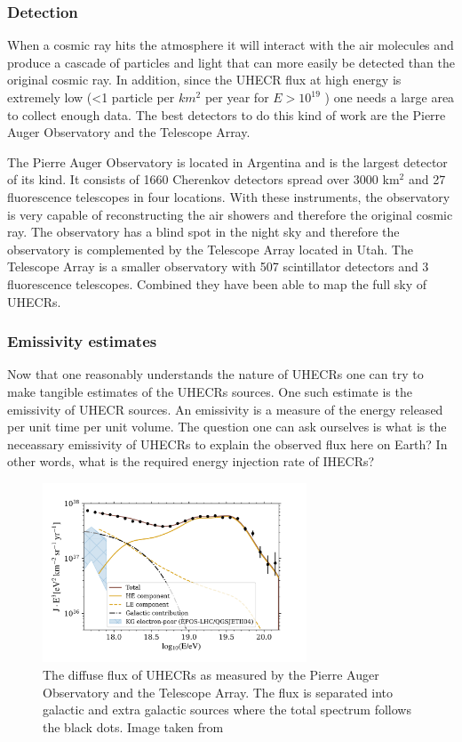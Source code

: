\documentclass{article}
\begin{document}

\subsubsection{Detection}
When a cosmic ray hits the atmosphere it will interact with the air molecules and produce a cascade of particles and light that can more easily be detected than 
the original cosmic ray. In addition, since the UHECR flux at high energy is extremely low (<1 particle per $km^2$ per year for $E > 10^{19}$ ) one needs a large area to collect enough data. 
The best detectors to do this kind of work are the Pierre Auger Observatory and the Telescope Array. 

The Pierre Auger Observatory is located in Argentina and is the largest detector of its kind. It consists of 1660  Cherenkov detectors spread over 3000 km$^2$ and 27 fluorescence telescopes in four locations. With 
these instruments, the observatory is very capable of reconstructing the air showers and therefore the original cosmic ray. The observatory has a blind spot in the night sky 
and therefore the observatory is complemented by the Telescope Array located in Utah. The Telescope Array is a smaller observatory with 507 scintillator detectors and 3 fluorescence telescopes. Combined they have been able to map the full sky of UHECRs.  

\subsubsection{Emissivity estimates}
\label{sec:emmisivity}

Now that one reasonably understands the nature of UHECRs one can try to make tangible estimates of the UHECRs sources. One such
estimate is the emissivity of UHECR sources. An emissivity is a measure of the energy released per unit time per unit volume. The question 
one can ask ourselves is what is the neceassary emissivity of UHECRs to explain the observed flux here on Earth? In other words, what is the required energy injection rate of IHECRs?


\begin{figure}
    \centering
    \includegraphics[width = 0.7\textwidth]{UHECRs.png}
    \caption{The diffuse flux of UHECRs as measured by the Pierre Auger Observatory and the Telescope Array. The flux is separated into galactic and extra galactic sources where the total spectrum follows the black dots. Image taken from \cite{Abdul_Halim_2023}}
    \label{fig:flux_UHECRs}
\end{figure}
\end{document}

